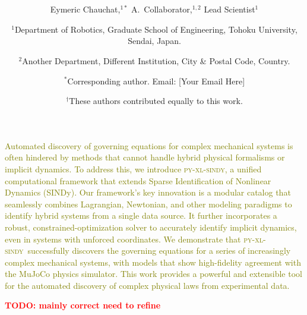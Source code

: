 \documentclass[12pt]{article}
\date{}
\title{\bfseries \boldmath \scititle}
\author{
	Eymeric Chauchat,$^{1\ast}$
	A.~Collaborator,$^{1,2}$
	Lead Scientist$^{1}$\and
	\small$^{1}$Department of Robotics, Graduate School of Engineering, Tohoku University, Sendai, Japan.\and
	\small$^{2}$Another Department, Different Institution, City \& Postal Code, Country.\and
	\small$^\ast$Corresponding author. Email: [Your Email Here]\and
	\small$^\dagger$These authors contributed equally to this work.
	\TODO{correctly format, add correct people}
}
\renewenvironment{abstract}
	{\quotation}
	{\endquotation}
\newcommand{\frameworkname}{\textsc{py-xl-sindy}}
\newcommand{\TODO}[1]{\textbf{\textcolor{red}{\Large TODO: \normalsize #1}}}
\newcommand{\airevised}[1]{\textcolor{olive}{\small #1}}
\begin{document}
 

\maketitle

\begin{abstract} \bfseries \boldmath

\airevised{Automated discovery of governing equations for complex mechanical systems is often hindered by methods that cannot handle hybrid physical formalisms or implicit dynamics. To address this, we introduce \frameworkname, a unified computational framework that extends Sparse Identification of Nonlinear Dynamics (SINDy). Our framework's key innovation is a modular catalog that seamlessly combines Lagrangian, Newtonian, and other modeling paradigms to identify hybrid systems from a single data source. It further incorporates a robust, constrained-optimization solver to accurately identify implicit dynamics, even in systems with unforced coordinates. We demonstrate that \frameworkname\ successfully discovers the governing equations for a series of increasingly complex mechanical systems, with models that show high-fidelity agreement with the MuJoCo physics simulator. This work provides a powerful and extensible tool for the automated discovery of complex physical laws from experimental data.}

\TODO{mainly correct need to refine}
\end{abstract}
\end{document}
